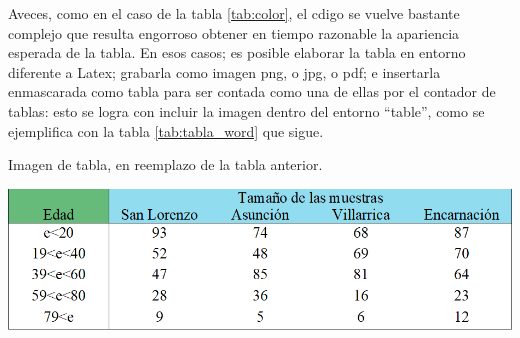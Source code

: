 Aveces, como en el caso de la tabla \ref{tab:color}, el cdigo se vuelve bastante complejo que resulta engorroso obtener en tiempo razonable la apariencia esperada de la tabla. En esos casos; es posible elaborar la tabla en entorno diferente a Latex; grabarla como imagen png, o jpg, o pdf; e insertarla enmascarada como tabla para ser contada como una de ellas por el contador de tablas: esto se logra con incluir la imagen dentro del entorno ``table'', como se ejemplifica con la tabla \ref{tab:tabla_word} que sigue.

\begin{table}[H]
	\begin{center}
		\caption{Imagen de tabla, en reemplazo de la tabla anterior.}
		\label{tab:tabla_word}
		\includegraphics[scale=.65]{./capitulo_04/tabla_word.png}
	\end{center}
\end{table}
\renewcommand{\labelitemi}{$-$}

